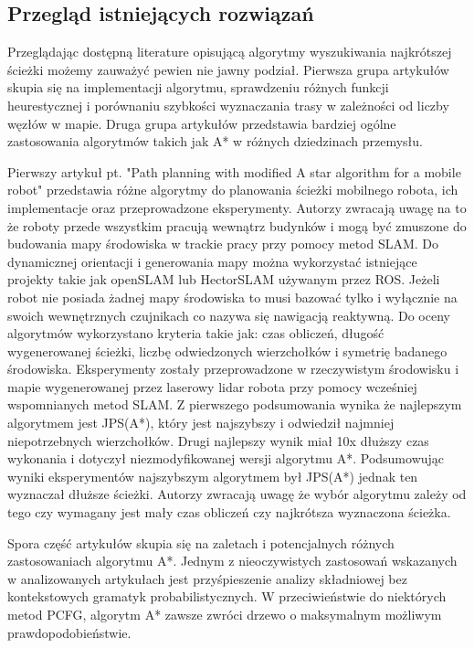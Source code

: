 \subsection{Przegląd istniejących rozwiązań}

Przeglądając dostępną literature opisującą algorytmy wyszukiwania najkrótszej ścieżki
możemy zauważyć pewien nie jawny podział. Pierwsza grupa artykułów skupia się na implementacji 
algorytmu, sprawdzeniu różnych funkcji heurestycznej i porównaniu szybkości wyznaczania trasy w 
zależności od liczby węzłów w mapie. Druga grupa artykułów przedstawia bardziej ogólne zastosowania 
algorytmów takich jak A* w różnych dziedzinach przemysłu.


Pierwszy artykuł pt. "Path planning with modified A star algorithm for a mobile robot"\cite{art1}
przedstawia różne algorytmy do planowania ścieżki mobilnego robota, ich implementacje oraz przeprowadzone eksperymenty.
Autorzy zwracają uwagę na to że roboty przede wszystkim pracują wewnątrz budynków i mogą być zmuszone
do budowania mapy środowiska w trackie pracy przy pomocy metod SLAM. Do dynamicznej orientacji i generowania mapy można
wykorzystać istniejące projekty takie jak openSLAM\cite{openSLAM} lub HectorSLAM\cite{hectorSLAM} używanym przez ROS.
Jeżeli robot nie posiada żadnej mapy środowiska to musi bazować tylko i wyłącznie na swoich wewnętrznych czujnikach 
co nazywa się nawigacją reaktywną. Do oceny algorytmów wykorzystano kryteria takie jak: czas obliczeń, długość wygenerowanej ścieżki,
liczbę odwiedzonych wierzchołków i symetrię badanego środowiska. 
Eksperymenty zostały przeprowadzone w rzeczywistym środowisku i mapie wygenerowanej przez laserowy lidar robota przy pomocy wcześniej wspomnianych metod SLAM.
Z pierwszego podsumowania wynika że najlepszym algorytmem jest JPS(A*), który jest najszybszy i odwiedził najmniej 
niepotrzebnych wierzchołków. Drugi najlepszy wynik miał 10x dłuższy czas wykonania i dotyczył niezmodyfikowanej wersji algorytmu A*.
Podsumowując wyniki eksperymentów najszybszym algorytmem był JPS(A*) jednak ten wyznaczał dłuższe ścieżki. 
Autorzy zwracają uwagę że wybór algorytmu zależy od tego czy wymagany jest mały czas obliczeń czy najkrótsza wyznaczona ścieżka.


Spora część artykułów skupia się na zaletach i potencjalnych różnych zastosowaniach algorytmu A*. Jednym z nieoczywistych 
zastosowań wskazanych w analizowanych artykułach jest przyśpieszenie analizy składniowej bez kontekstowych gramatyk probabilistycznych.
W przeciwieństwie do niektórych metod PCFG, algorytm A* zawsze zwróci drzewo o maksymalnym możliwym prawdopodobieństwie. \cite{parsowanieA}

